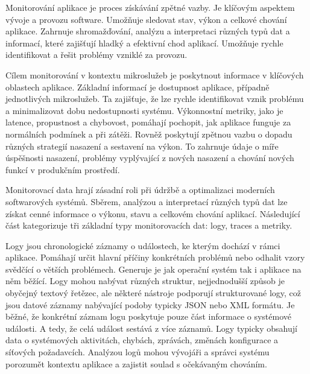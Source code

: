 


Monitorování aplikace je proces získávání zpětné vazby. Je klíčovým aspektem vývoje a provozu software. Umožňuje sledovat stav, výkon a celkové chování aplikace. Zahrnuje shromažďování, analýzu a interpretaci různých typů dat a informací, které zajišťují hladký a efektivní chod aplikací. Umožňuje rychle identifikovat a řešit problémy vzniklé za provozu. \cite{Riedesel2021}


Cílem monitorování v kontextu mikroslužeb je poskytnout informace v klíčových oblastech aplikace. Základní informací je dostupnost aplikace, případně jednotlivých mikroslužeb. Ta zajišťuje, že lze rychle identifikovat vznik problému a minimalizovat dobu nedostupnosti systému. Výkonnostní metriky, jako je latence, propustnost a chybovost, pomáhají pochopit, jak aplikace funguje za normálních podmínek a při zátěži. \cite{Riedesel2021} Rovněž poskytují zpětnou vazbu o dopadu různých strategií nasazení a sestavení na výkon. To zahrnuje údaje o míře úspěšnosti nasazení, problémy vyplývající z nových nasazení a chování nových funkcí v produkčním prostředí.


Monitorovací data hrají zásadní roli při údržbě a optimalizaci moderních softwarových systémů. Sběrem, analýzou a interpretací různých typů dat lze získat cenné informace o výkonu, stavu a celkovém chování aplikací. Následující část kategorizuje tři základní typy monitorovacích dat: logy, traces a metriky. \cite{Majors2022}


Logy jsou chronologické záznamy o událostech, ke kterým dochází v rámci aplikace. Pomáhají určit hlavní příčiny konkrétních problémů nebo odhalit vzory svědčící o větších problémech. Generuje je jak operační systém tak i aplikace na něm běžící. Logy mohou nabývat různých struktur, nejjednodušší způsob je obyčejný textový řetězec, ale některé nástroje podporují strukturované logy, což jsou datové záznamy nabývající podoby typicky JSON nebo XML formátu. Je běžné, že konkrétní záznam logu poskytuje pouze část informace o systémové události. A tedy, že celá událost sestává z více záznamů. \cite{Majors2022} Logy typicky obsahují data o systémových aktivitách, chybách, zprávách, změnách konfigurace a síťových požadavcích. Analýzou logů mohou vývojáři a správci systému porozumět kontextu aplikace a zajistit soulad s očekávaným chováním. \cite{Majors2022}

